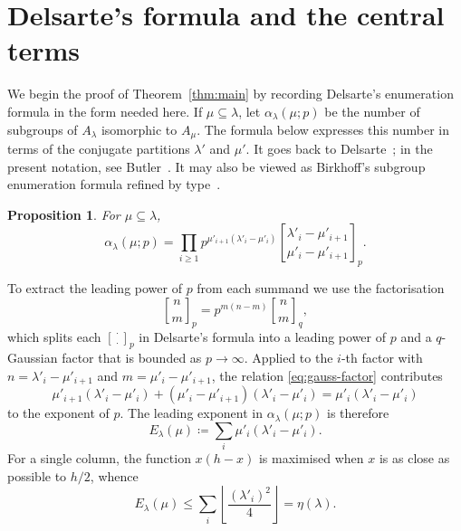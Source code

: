 \documentclass[a4paper,11pt,reqno]{amsart}
\theoremstyle{plain}
\newtheorem{proposition}[theorem]{Proposition}
\theoremstyle{remark}
\numberwithin{equation}{section}
\newcommand{\gauss}[2]{\genfrac{[}{]}{0pt}{}{#1}{#2}_p}
\newcommand{\qgauss}[2]{\genfrac{[}{]}{0pt}{}{#1}{#2}_q}
\renewcommand{\leq}{\leqslant}
\renewcommand{\geq}{\geqslant}
\begin{document}
\section{Delsarte's formula and the central terms}
\label{sec:delsarte}

We begin the proof of Theorem~\ref{thm:main} by recording Delsarte's
enumeration formula in the form needed here. If $\mu\subseteq\lambda$, let
$\alpha_\lambda(\mu;p)$ be the number of subgroups of $A_\lambda$ isomorphic
to $A_\mu$. The formula below expresses this number in terms of the conjugate
partitions $\lambda'$ and $\mu'$. It goes back to Delsarte~\cite{Delsarte};
in the present notation, see Butler~\cite[p.~21, Eq.~(1.9)]{Butler}. It may
also be viewed as Birkhoff's subgroup enumeration formula refined by
type~\cite{Birkhoff}.

\begin{proposition}\label{prop:delsarte}
For $\mu\subseteq\lambda$,
\begin{equation}\label{eq:delsarte}
        \alpha_\lambda(\mu;p)=
        \prod_{i\geq 1}
        p^{\mu'_{i+1}(\lambda'_i-\mu'_i)}
        \gauss{\lambda'_i-\mu'_{i+1}}{\mu'_i-\mu'_{i+1}}.    
\end{equation}
\end{proposition}

To extract the leading power of $p$ from each summand we use the factorisation
\begin{equation}\label{eq:gauss-factor}
        \gauss{n}{m}=p^{m(n-m)}\qgauss{n}{m},
\end{equation}
which splits each $\gauss{\cdot}{\cdot}$ in Delsarte's formula into a leading
power of $p$ and a $q$-Gaussian factor that is bounded as $p\to\infty$.
Applied to the $i$-th factor with $n=\lambda'_i-\mu'_{i+1}$ and
$m=\mu'_i-\mu'_{i+1}$, the relation \eqref{eq:gauss-factor} contributes
\[
        \mu'_{i+1}(\lambda'_i-\mu'_i)
        +(\mu'_i-\mu'_{i+1})(\lambda'_i-\mu'_i)
        =\mu'_i(\lambda'_i-\mu'_i)
\]
to the exponent of $p$. The leading exponent in $\alpha_\lambda(\mu;p)$ is
therefore
\[
        E_\lambda(\mu) \coloneqq
        \sum_i \mu'_i(\lambda'_i-\mu'_i).
\]
For a single column, the function $x(h-x)$ is maximised when $x$ is as close
as possible to $h/2$, whence
\[
        E_\lambda(\mu)
        \leq
        \sum_i\left\lfloor\frac{(\lambda'_i)^2}{4}\right\rfloor
        =\eta(\lambda).
\]
\end{document}
